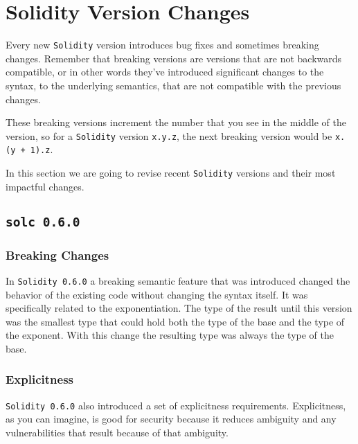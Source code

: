 \section{Solidity Version Changes}\label{solidity-version-changes}

Every new \texttt{Solidity} version introduces bug fixes and sometimes
breaking changes. Remember that breaking versions are versions that are
not backwards compatible, or in other words they've introduced
significant changes to the syntax, to the underlying semantics, that are
not compatible with the previous changes.

These breaking versions increment the number that you see in the middle
of the version, so for a \texttt{Solidity} version \texttt{x.y.z}, the
next breaking version would be \texttt{x.(y\ +\ 1).z}.

In this section we are going to revise recent \texttt{Solidity} versions
and their most impactful changes.

\subsection{\texorpdfstring{\texttt{solc\ 0.6.0}}{solc 0.6.0}}\label{solc-0.6.0}

\subsubsection{Breaking Changes}\label{breaking-changes}

In \texttt{Solidity\ 0.6.0} a breaking semantic feature that was
introduced changed the behavior of the existing code without changing
the syntax itself. It was specifically related to the exponentiation.
The type of the result until this version was the smallest type that
could hold both the type of the base and the type of the exponent. With
this change the resulting type was always the type of the base.

\subsubsection{Explicitness}\label{explicitness}

\texttt{Solidity\ 0.6.0} also introduced a set of explicitness
requirements. Explicitness, as you can imagine, is good for security
because it reduces ambiguity and any vulnerabilities that result because
of that ambiguity.

